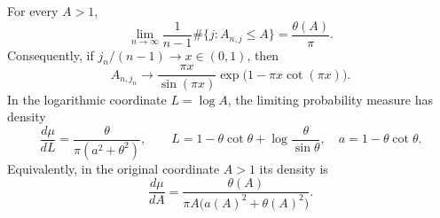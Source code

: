 \begin{theorem}
\label{thm:velocity-zero-law}
For every $A>1$,
\begin{equation}\label{eq:zero-law-cdf}
 \lim_{n\to\infty}\frac1{n-1}
       \#\{j:A_{n,j}\leq A\}=\frac{\theta(A)}\pi.
\end{equation}
Consequently, if $j_n/(n-1)\to x\in(0,1)$, then
\begin{equation}\label{eq:zero-law-quantile}
 A_{n,j_n}\longrightarrow
 \frac{\pi x}{\sin(\pi x)}\exp\bigl(1-\pi x\cot(\pi x)\bigr).
\end{equation}
In the logarithmic coordinate $L=\log A$, the limiting probability
measure has density
\begin{equation}\label{eq:zero-law-density}
 \frac{d\mu}{dL}
   =\frac{\theta}{\pi(a^2+\theta^2)},\qquad
 L=1-\theta\cot\theta+\log\frac\theta{\sin\theta},
 \quad a=1-\theta\cot\theta.
\end{equation}
Equivalently, in the original coordinate $A>1$ its density is
\begin{equation}\label{eq:zero-law-density-A}
 \frac{d\mu}{dA}=\frac{\theta(A)}
              {\pi A\bigl(a(A)^2+\theta(A)^2\bigr)}.
\end{equation}
\end{theorem}

